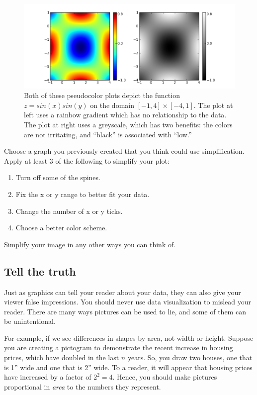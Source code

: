 \begin{figure}
\centering
\includegraphics[width=\textwidth]{heatmap.png}
\caption{Both of these pseudocolor plots depict the function $z = sin(x)sin(y)$ on the domain $[-1,4] \times [-4,1]$. 
The plot at left uses a rainbow gradient which has no relationship to the data. 
The plot at right uses a greyscale, which has two benefits: the colors are not irritating, and ``black'' is associated with ``low.''}
\label{fig:heatmap}
\end{figure}

\begin{problem}
Choose a graph you previously created that you think could use simplification. 
Apply at least 3 of the following to simplify your plot:
\begin{enumerate}
\item Turn off some of the spines.
\item Fix the x or y range to better fit your data.
\item Change the number of x or y ticks.
\item Choose a better color scheme.
\end{enumerate}
Simplify your image in any other ways you can think of.
\end{problem}

\subsection*{Tell the truth}

Just as graphics can tell your reader about your data, they can also give your viewer false impressions. 
You should never use data visualization to mislead your reader. 
There are many ways pictures can be used to lie, and some of them can be unintentional.

For example, if we see differences in shapes by area, not width or height. 
Suppose you are creating a pictogram to demonstrate the recent increase in housing prices, which have doubled in the last $n$ years. 
So, you draw two houses, one that is 1'' wide and one that is 2'' wide. 
To a reader, it will appear that housing prices have increased by a factor of $2^2=4$. 
Hence, you should make pictures proportional in \emph{area} to the numbers they represent.

